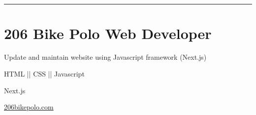 
\vspace{3.4ex}
\section{}{}

{\hspace{-1.72in}\noindent\color{cblue}{SOFTWARE PROJECTS} }

\vspace{-1.6ex}
{\hspace{-1.73in}\noindent\color{dblue}\rule{6.935in}{0.4pt}}

\vspace{-0.4ex}


\section{
    \textbf{206 Bike Polo} \newline
    Web Developer
}{}

\begin{detail}
    \BulletItem
    Update and maintain website using Javascript framework (Next.js)
\end{detail}

\begin{subtitle}
    \vspace{-5ex}
    {{}} 
\end{subtitle}

\vspace{-1.5ex}
{
    \vspace{-0.8ex}
    \color{cyan}\small
    {HTML || CSS || Javascript}
}

{
    \vspace{-2.5ex}\hspace{1.5in}
    \color{cyan}\small
    {Next.js}
}

{
    \vspace{-2.5ex}\hspace{3in}
    \color{blue}\small
    {\href{https://www.206bikepolo.com}{206bikepolo.com}{}}
}





